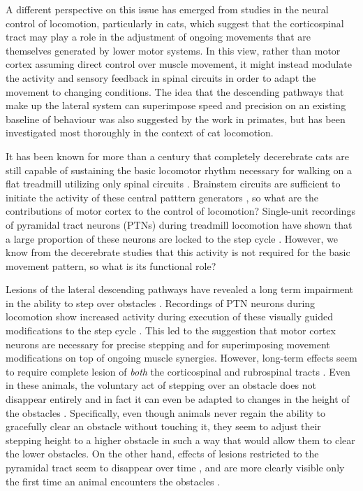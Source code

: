 A different perspective on this issue has emerged from studies in the neural control of locomotion, particularly in cats, which suggest that the corticospinal tract may play a role in the adjustment of ongoing movements that are themselves generated by lower motor systems. In this view, rather than motor cortex assuming direct control over muscle movement, it might instead modulate the activity and sensory feedback in spinal circuits in order to adapt the movement to changing conditions. The idea that the descending pathways that make up the lateral system can superimpose speed and precision on an existing baseline of behaviour was also suggested by the work in primates, but has been investigated most thoroughly in the context of cat locomotion.

It has been known for more than a century that completely decerebrate cats are still capable of sustaining the basic locomotor rhythm necessary for walking on a flat treadmill utilizing only spinal circuits \cite{GrahamBrown1911}. Brainstem circuits are sufficient to initiate the activity of these central patttern generators \cite{Grillner1973}, so what are the contributions of motor cortex to the control of locomotion? Single-unit recordings of pyramidal tract neurons (PTNs) during treadmill locomotion have shown that a large proportion of these neurons are locked to the step cycle \cite{Armstrong1984a}. However, we know from the decerebrate studies that this activity is not required for the basic movement pattern, so what is its functional role?

Lesions of the lateral descending pathways have revealed a long term impairment in the ability to step over obstacles \cite{Drew2002}. Recordings of PTN neurons during locomotion show increased activity during execution of these visually guided modifications to the step cycle \cite{Drew1996}. This led to the suggestion that motor cortex neurons are necessary for precise stepping and for superimposing movement modifications on top of ongoing muscle synergies. However, long-term effects seem to require complete lesion of \emph{both} the corticospinal and rubrospinal tracts \cite{Drew2002}. Even in these animals, the voluntary act of stepping over an obstacle does not disappear entirely and in fact it can even be adapted to changes in the height of the obstacles \cite{Drew2002}. Specifically, even though animals never regain the ability to gracefully clear an obstacle without touching it, they seem to adjust their stepping height to a higher obstacle in such a way that would allow them to clear the lower obstacles. On the other hand, effects of lesions restricted to the pyramidal tract seem to disappear over time \cite{Liddell1944}, and are more clearly visible only the first time an animal encounters the obstacles \cite{Liddell1944}.

